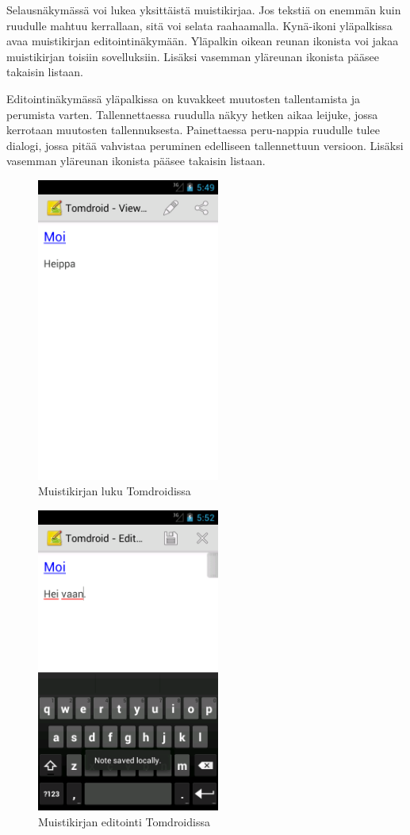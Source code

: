 Selausnäkymässä voi lukea yksittäistä muistikirjaa. Jos tekstiä on enemmän kuin ruudulle mahtuu kerrallaan, sitä voi selata raahaamalla. Kynä-ikoni yläpalkissa avaa muistikirjan editointinäkymään. Yläpalkin oikean reunan ikonista voi jakaa muistikirjan toisiin sovelluksiin. Lisäksi vasemman yläreunan ikonista pääsee takaisin listaan.

Editointinäkymässä yläpalkissa on kuvakkeet muutosten tallentamista ja perumista varten. Tallennettaessa ruudulla näkyy hetken aikaa leijuke, jossa kerrotaan muutosten tallennuksesta. Painettaessa peru-nappia ruudulle tulee dialogi, jossa pitää vahvistaa peruminen edelliseen tallennettuun versioon. Lisäksi vasemman yläreunan ikonista pääsee takaisin listaan.

\begin{figure}[htb]
\includegraphics[width=60mm]{tomdroid_noteview.png}
\caption{Muistikirjan luku Tomdroidissa} \label{tomdroid_noteview}
\end{figure}

\begin{figure}[htb]
\includegraphics[width=60mm]{tomdroid_editview.png}
\caption{Muistikirjan editointi Tomdroidissa} \label{tomdroid_editview}
\end{figure}

